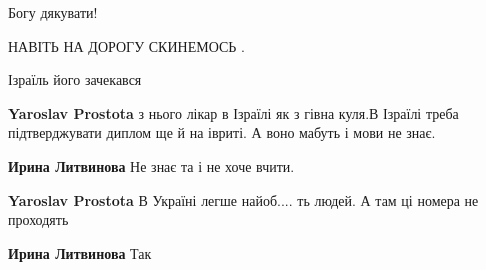 \begin{itemize}
Богу дякувати!

 
НАВІТЬ НА ДОРОГУ СКИНЕМОСЬ .

 
Ізраїль його зачекався

\begin{itemize}
 
\textbf{Yaroslav Prostota} з нього лікар в Ізраїлі як з гівна куля.В Ізраїлі треба підтверджувати диплом ще й на івриті. А воно мабуть і мови не знає.

\begin{itemize}
 
\textbf{Ирина Литвинова} Не знає та і не хоче вчити.

 
\textbf{Yaroslav Prostota} В Україні легше найоб.... ть людей. А там ці номера не проходять

 
\textbf{Ирина Литвинова} Так
\end{itemize}


\end{itemize}
\end{itemize}
